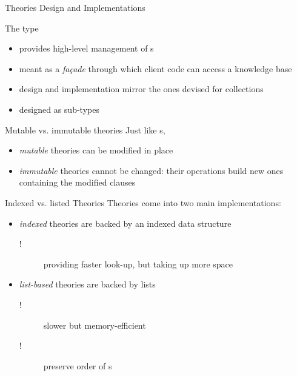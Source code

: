 \documentclass[handout]{beamer}
\begin{document}
\begin{frame}[allowframebreaks]{Theories Design and Implementations}

    \begin{block}{The  type}
        \begin{itemize}
            \item provides high-level management of s
            \item meant as a \textit{façade} through which client code can access a knowledge base
            \item design and implementation mirror the ones devised for  collections
            \item designed as  sub-types
        \end{itemize}
    \end{block}

    \framebreak

    \begin{block}{Mutable vs. immutable theories}
        Just like s,
        \begin{itemize}
            \item \textit{mutable} theories can be modified in place
            \item \textit{immutable} theories cannot be changed: their operations build new ones containing the modified clauses
        \end{itemize}
    \end{block}
    \begin{block}{Indexed vs. listed Theories}
        Theories come into two main implementations:
        \begin{itemize}
            \item \textit{indexed} theories are backed by an indexed data structure
            \begin{description}
                \item [!] providing faster look-up, but taking up more space
            \end{description}
            \item \textit{list-based} theories are backed by lists
            \begin{description}
                \item [!] slower but memory-efficient
                \item [!] preserve order of s
            \end{description}
        \end{itemize}
    \end{block}

\end{frame}
\end{document}
